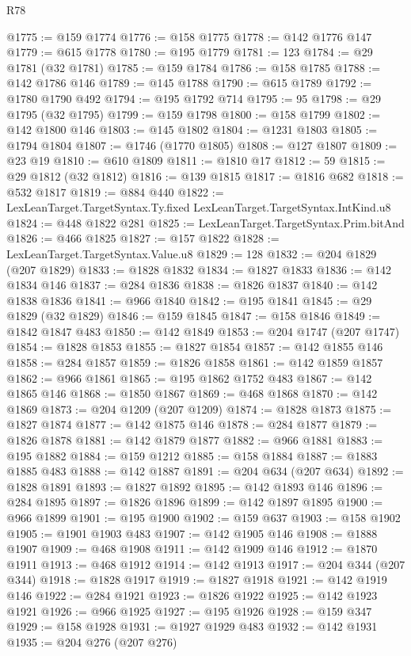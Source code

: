 \begin{lexlean}{R78}
\begin{coremodule}
@1775 := @159 @1774
@1776 := @158 @1775
@1778 := @142 @1776 @147
@1779 := @615 @1778
@1780 := @195 @1779
@1781 := 123
@1784 := @29 @1781 (@32 @1781)
@1785 := @159 @1784
@1786 := @158 @1785
@1788 := @142 @1786 @146
@1789 := @145 @1788
@1790 := @615 @1789
@1792 := @1780 @1790 @492
@1794 := @195 @1792 @714
@1795 := 95
@1798 := @29 @1795 (@32 @1795)
@1799 := @159 @1798
@1800 := @158 @1799
@1802 := @142 @1800 @146
@1803 := @145 @1802
@1804 := @1231 @1803
@1805 := @1794 @1804
@1807 := @1746 (@1770 @1805)
@1808 := @127 @1807
@1809 := @23 @19
@1810 := @610 @1809
@1811 := @1810 @17
@1812 := 59
@1815 := @29 @1812 (@32 @1812)
@1816 := @139 @1815
@1817 := @1816 @682
@1818 := @532 @1817
@1819 := @884 @440
@1822 := LexLeanTarget.TargetSyntax.Ty.fixed LexLeanTarget.TargetSyntax.IntKind.u8
@1824 := @448 @1822 @281
@1825 := LexLeanTarget.TargetSyntax.Prim.bitAnd
@1826 := @466 @1825
@1827 := @157 @1822
@1828 := LexLeanTarget.TargetSyntax.Value.u8
@1829 := 128
@1832 := @204 @1829 (@207 @1829)
@1833 := @1828 @1832
@1834 := @1827 @1833
@1836 := @142 @1834 @146
@1837 := @284 @1836
@1838 := @1826 @1837
@1840 := @142 @1838 @1836
@1841 := @966 @1840
@1842 := @195 @1841
@1845 := @29 @1829 (@32 @1829)
@1846 := @159 @1845
@1847 := @158 @1846
@1849 := @1842 @1847 @483
@1850 := @142 @1849
@1853 := @204 @1747 (@207 @1747)
@1854 := @1828 @1853
@1855 := @1827 @1854
@1857 := @142 @1855 @146
@1858 := @284 @1857
@1859 := @1826 @1858
@1861 := @142 @1859 @1857
@1862 := @966 @1861
@1865 := @195 @1862 @1752 @483
@1867 := @142 @1865 @146
@1868 := @1850 @1867
@1869 := @468 @1868
@1870 := @142 @1869
@1873 := @204 @1209 (@207 @1209)
@1874 := @1828 @1873
@1875 := @1827 @1874
@1877 := @142 @1875 @146
@1878 := @284 @1877
@1879 := @1826 @1878
@1881 := @142 @1879 @1877
@1882 := @966 @1881
@1883 := @195 @1882
@1884 := @159 @1212
@1885 := @158 @1884
@1887 := @1883 @1885 @483
@1888 := @142 @1887
@1891 := @204 @634 (@207 @634)
@1892 := @1828 @1891
@1893 := @1827 @1892
@1895 := @142 @1893 @146
@1896 := @284 @1895
@1897 := @1826 @1896
@1899 := @142 @1897 @1895
@1900 := @966 @1899
@1901 := @195 @1900
@1902 := @159 @637
@1903 := @158 @1902
@1905 := @1901 @1903 @483
@1907 := @142 @1905 @146
@1908 := @1888 @1907
@1909 := @468 @1908
@1911 := @142 @1909 @146
@1912 := @1870 @1911
@1913 := @468 @1912
@1914 := @142 @1913
@1917 := @204 @344 (@207 @344)
@1918 := @1828 @1917
@1919 := @1827 @1918
@1921 := @142 @1919 @146
@1922 := @284 @1921
@1923 := @1826 @1922
@1925 := @142 @1923 @1921
@1926 := @966 @1925
@1927 := @195 @1926
@1928 := @159 @347
@1929 := @158 @1928
@1931 := @1927 @1929 @483
@1932 := @142 @1931
@1935 := @204 @276 (@207 @276)

\end{coremodule}
\end{lexlean}
